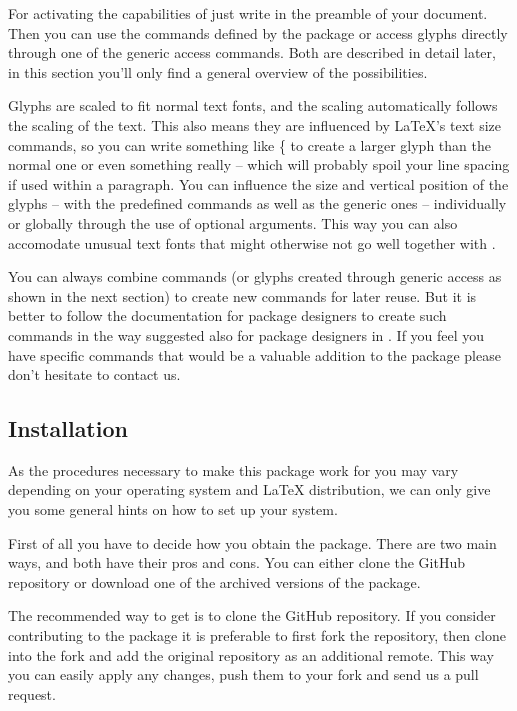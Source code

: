 \documentclass{article}
\begin{document}
\bigskip
For activating the capabilities of \lilyglyphs just write  in the preamble of your document. 
Then you can use the commands defined by the package or access glyphs directly through one of the generic access commands.
Both are described in detail later, in this section you'll only find a general overview of the possibilities.

Glyphs are scaled to fit normal text fonts, and the scaling automatically follows the scaling of the text. 
This also means they are influenced by \LaTeX 's text size commands, so you can write something like \{ to create a larger {\Large \flat}glyph than the normal \flat one or even something really  {\Huge {}} -- which will probably spoil your line spacing if used within a paragraph. 
You can influence the size and vertical position of the glyphs -- with the predefined commands as well as the generic ones -- individually or globally through the use of optional arguments.
This way you can also accomodate unusual text fonts that might otherwise not go well together with \lilyglyphs.

You can always combine commands (or glyphs created through generic access as shown in the next section) to create new commands for later reuse. 
But it is better to follow the documentation for package designers to create such commands in the way suggested also for package designers in .
If you feel you have specific commands that would be a valuable addition to the package please don't hesitate to contact us.

\subsection{Installation}
\label{subsec:installation}
As the procedures necessary to make this package work for you may vary depending on your operating system and \LaTeX{} distribution, we can only give you some general hints on how to set up your system.

First of all you have to decide how you obtain the package.
There are two main ways, and both have their pros and cons.
You can either clone the GitHub repository or download one of the archived versions of the package.

The recommended way to get \lilyglyphs{} is to clone the GitHub repository.
If you consider contributing to the package it is preferable to first fork the repository, then clone into the fork and add the original repository as an additional remote.
This way you can easily apply any changes, push them to your fork and send us a pull request.
\end{document}
